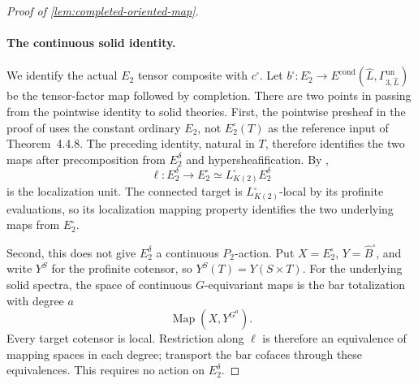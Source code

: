 \begin{proof}[Proof of \cref{lem:completed-oriented-map}]
\paragraph{The continuous solid identity.}
We identify the actual \(E_2\) tensor composite with \(c^\square\).
Let \(b^\square:E_2^\square\to
E^{\mathrm{cond}}(\widehat L,\Gamma^{\mathrm{un}}_{3,\widehat L})\)
be the tensor-factor map followed by completion. There are two points in
passing from the pointwise identity to solid theories. First,
the pointwise presheaf in the proof of
\cite[Proposition~4.5.12]{BMR2026} uses the constant ordinary \(E_2\), not \(E_2^\square(T)\) as the reference input
of Theorem~4.4.8. The preceding identity, natural in \(T\), therefore
identifies the two maps after precomposition from \(E_2^\delta\) and
hypersheafification. By \cite[Lemma~4.5.8]{BMR2026},
\[
 \ell:E_2^\delta\longrightarrow E_2^\square
       \simeq L^\square_{K(2)}E_2^\delta
\]
is the localization unit. The connected target is
\(L^\square_{K(2)}\)-local by its profinite evaluations, so its localization
mapping property identifies the two underlying maps from \(E_2^\square\).

Second, this does not give \(E_2^\delta\) a continuous \(P_2\)-action.
Put \(X=E_2^\square\), \(Y=\widehat B^\square\), and write \(Y^S\) for the
profinite cotensor, so \(Y^S(T)=Y(S\times T)\). For the underlying solid
spectra, the space of continuous \(G\)-equivariant maps is the bar
totalization with degree \(a\)
\[
 \operatorname{Map}(X,Y^{G^a}).
\]
Every target cotensor is local. Restriction along \(\ell\) is therefore
an equivalence of mapping spaces in each degree; transport the bar cofaces
through these equivalences. This requires no action on \(E_2^\delta\).


\end{proof}
